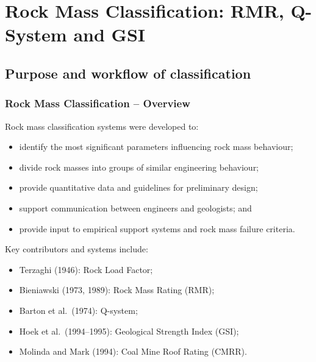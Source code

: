 \chapter{Rock Mass Classification: RMR, Q-System and GSI}
\label{ch:classification}

\section{Purpose and workflow of classification}
\label{sec:purpose-and-workflow-of-classification}

\subsection{Rock Mass Classification -- Overview}

Rock mass classification systems were developed to:
\begin{itemize}
 \item identify the most significant parameters influencing rock mass behaviour;
 \item divide rock masses into groups of similar engineering behaviour;
 \item provide quantitative data and guidelines for preliminary design;
 \item support communication between engineers and geologists; and
 \item provide input to empirical support systems and rock mass failure criteria.
\end{itemize}

Key contributors and systems include:
\begin{itemize}
 \item Terzaghi (1946): Rock Load Factor;
 \item Bieniawski (1973, 1989): Rock Mass Rating (RMR);
 \item Barton et al.\ (1974): Q-system;
 \item Hoek et al.\ (1994--1995): Geological Strength Index (GSI);
 \item Molinda and Mark (1994): Coal Mine Roof Rating (CMRR).
\end{itemize}

